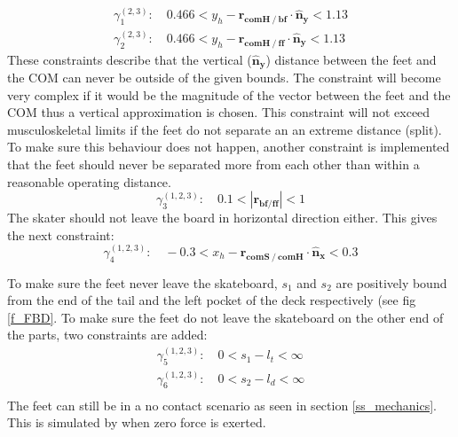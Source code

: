 \begin{equation}\label{\e_yeadon}
\begin{split}
    \gamma_{1}^{(2,3)}:\quad  0.466 < y_h - \mathbf{r_{comH \mathbin{/} bf}} \cdot \mathbf{\hat n_y} < 1.13 \\ 
    \gamma_{2}^{(2,3)}:\quad  0.466 < y_h - \mathbf{r_{comH \mathbin{/} ff}} \cdot \mathbf{\hat n_y} < 1.13 
\end{split}
\end{equation}
These constraints describe that the vertical ($\mathbf{ \hat n_y}$) distance between the feet and the COM can never be outside of the given bounds. The constraint will become very complex if it would be the magnitude of the vector between the feet and the COM thus a vertical approximation is chosen. This constraint will not exceed musculoskeletal limits if the feet do not separate an an extreme distance (split). To make sure this behaviour does not happen, another constraint is implemented that the feet should never be separated more from each other than within a reasonable operating distance.
\begin{equation}
        \gamma_{3}^{(1,2,3)}:\quad   0.1 < |\mathbf{r_{bf/ff}}| < 1
\end{equation}
The skater should not leave the board in horizontal direction either. This gives the next constraint:
\begin{equation}
    \gamma_4^{(1,2,3)}:\quad  -0.3 < x_h - \mathbf{r_{comS\mathbin{/}comH}}\cdot \mathbf{\hat n_x} < 0.3
\end{equation}

To make sure the feet never leave the skateboard, $s_1$ and $s_2$ are positively bound from the end of the tail and the left pocket of the deck respectively (see fig \ref{f_FBD}. To make sure the feet do not leave the skateboard on the other end of the parts, two constraints are added:
\begin{equation}
\begin{array}{c}
    \gamma_{5}^{(1,2,3)}:\quad  0 < s_1-l_t < \infty  \\
    \gamma_{6}^{(1,2,3)}:\quad  0 < s_2-l_d < \infty  \\
\end{array}
\end{equation}
The feet can still be in a no contact scenario as seen in section \ref{ss_mechanics}. This is simulated by when zero force is exerted. 

